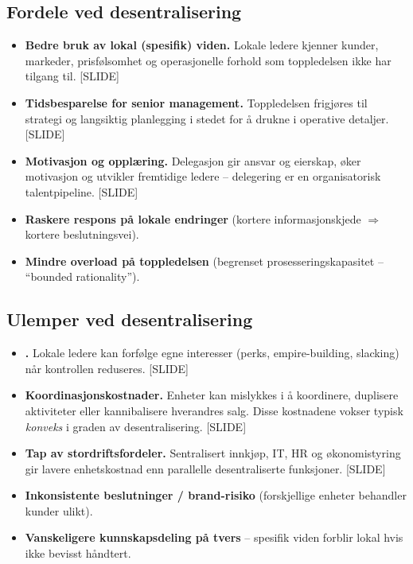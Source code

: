 \subsection*{Fordele ved desentralisering}
\begin{itemize}\setlength{\itemsep}{2pt}
\item \textbf{Bedre bruk av lokal (spesifik) viden.} Lokale ledere kjenner kunder, markeder, prisfølsomhet og operasjonelle forhold som toppledelsen ikke har tilgang til. [SLIDE]
\item \textbf{Tidsbesparelse for senior management.} Toppledelsen frigjøres til strategi og langsiktig planlegging i stedet for å drukne i operative detaljer. [SLIDE]
\item \textbf{Motivasjon og opplæring.} Delegasjon gir ansvar og eierskap, øker motivasjon og utvikler fremtidige ledere -- delegering er en organisatorisk talentpipeline. [SLIDE]
\item \textbf{Raskere respons på lokale endringer} (kortere informasjonskjede $\Rightarrow$ kortere beslutningsvei).
\item \textbf{Mindre overload på toppledelsen} (begrenset prosesseringskapasitet -- ``bounded rationality'').
\end{itemize}

\subsection*{Ulemper ved desentralisering}
\begin{itemize}\setlength{\itemsep}{2pt}
\item \textbf{.} Lokale ledere kan forfølge egne interesser (perks, empire-building, slacking) når kontrollen reduseres. [SLIDE]
\item \textbf{Koordinasjonskostnader.} Enheter kan mislykkes i å koordinere, duplisere aktiviteter eller kannibalisere hverandres salg. Disse kostnadene vokser typisk \emph{konveks} i graden av desentralisering. [SLIDE]
\item \textbf{Tap av stordriftsfordeler.} Sentralisert innkjøp, IT, HR og økonomistyring gir lavere enhetskostnad enn parallelle desentraliserte funksjoner. [SLIDE]
\item \textbf{Inkonsistente beslutninger / brand-risiko} (forskjellige enheter behandler kunder ulikt).
\item \textbf{Vanskeligere kunnskapsdeling på tvers} -- spesifik viden forblir lokal hvis ikke bevisst håndtert.
\end{itemize}

